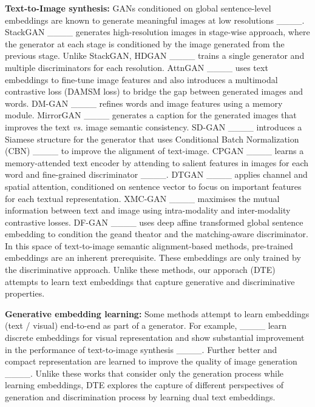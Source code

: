 \noindent \textbf{Text-to-Image synthesis:} GANs conditioned on global sentence-level embeddings are known to generate meaningful images at low resolutions ____. StackGAN ____ generates high-resolution images in stage-wise approach, where the generator at each stage is conditioned by the image generated from the previous stage. Unlike StackGAN, HDGAN ____ trains a single generator and multiple discriminators for each resolution. 
AttnGAN ____ uses text embeddings to fine-tune image features and also introduces a multimodal contrastive loss (DAMSM loss) to bridge the gap between generated images and words. DM-GAN ____ refines words and image features using a memory module. MirrorGAN ____ generates a caption for the generated images that improves the text \textit{vs.} image semantic consistency. SD-GAN ____ introduces a Siamese structure for the generator that uses Conditional Batch Normalization (CBN) ____ to improve the alignment of text-image. CPGAN ____ learns a memory-attended text encoder by attending to salient features in images for each word and fine-grained discriminator ____.  DTGAN ____ applies channel and spatial attention, conditioned on sentence vector to focus on important features for each textual representation. XMC-GAN ____ maximises the mutual information between text and image using intra-modality and inter-modality contrastive losses. DF-GAN ____ uses deep affine transformed global sentence embedding to condition the geand theator and the matching-aware discriminator. 
In this space of text-to-image semantic alignment-based methods, pre-trained embeddings are an inherent prerequisite. These embeddings are only trained by the discriminative approach. Unlike these methods, our apporach (DTE) attempts to learn text embeddings that capture generative and discriminative properties.  

\noindent \textbf{Generative embedding learning:} Some methods attempt to learn embeddings (text / visual) end-to-end as part of a generator. For example, ____ learn discrete embeddings for visual representation and show substantial improvement in the performance of text-to-image synthesis ____. Further better and compact representation are learned to improve the quality of image generation ____. Unlike these works that consider only the generation process while learning embeddings, DTE explores the capture of different perspectives of generation and discrimination process by learning dual text embeddings.

